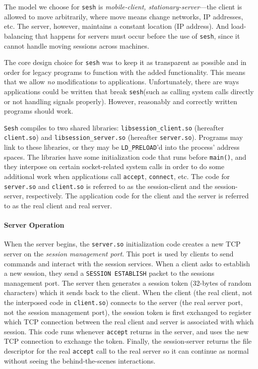 \documentclass[twocolumn,10pt]{article}
\newcommand{\sesh}{\texttt{sesh}\xspace}
\newcommand{\Sesh}{\texttt{Sesh}\xspace}
\begin{document}
The model we choose for \sesh is \textit{mobile-client, stationary-server}---the
client is allowed to move arbitrarily, where move means change networks, IP
addresses, etc. The server, however, maintains a constant location (IP address).
And load-balancing that happens for servers must occur before the use of \sesh,
since it cannot handle moving sessions across machines.

The core design choice for \sesh was to keep it as transparent as possible and
in order for legacy programs to function with the added functionality. This
means that we allow \textit{no} modifications to applications. Unfortunately,
there are ways applications could be written that break \sesh (such as calling
system calls directly or not handling signals properly). However, reasonably and
correctly written programs should work.

\newcommand{\clientso}{\texttt{client.so}\xspace}
\newcommand{\serverso}{\texttt{server.so}\xspace}

\Sesh compiles to two shared libraries: \texttt{libsession\_client.so}
(hereafter \clientso) and \texttt{libsession\_server.so} (hereafter \serverso).
Programs may link to these libraries, or they may be \texttt{LD\_PRELOAD}'d into
the process' address spaces. The libraries have some initialization code that
runs before \texttt{main()}, and they interpose on certain socket-related system
calls in order to do some additional work when applications call
\texttt{accept}, \texttt{connect}, etc. The code for \serverso and \clientso is
referred to as the session-client and the session-server, respectively. The
application code for the client and the server is referred to as the real client
and real server.

\paragraph{Server Operation}
When the server begins, the \serverso initialization code creates a new TCP
server on the \textit{session management port}. This port is used by clients to
send commands and interact with the session services.
When a client asks to
establish a new session, they send a \texttt{SESSION ESTABLISH} packet to the
sessions management port. The server then generates a session token (32-bytes of
random characters) which it sends back to the client. When the client (the real
client, not the interposed code in \clientso) connects to the server (the real
server port, not the session management port), the session token is first
exchanged to register which TCP connection between the real client and server is
associated with which session. This code runs whenever \texttt{accept} returns
in the server, and uses the new TCP connection to exchange the token. Finally,
the session-server returns the file descriptor for the real \texttt{accept} call to the
real server so it can continue as normal without seeing the behind-the-scenes
interactions.
\end{document}
